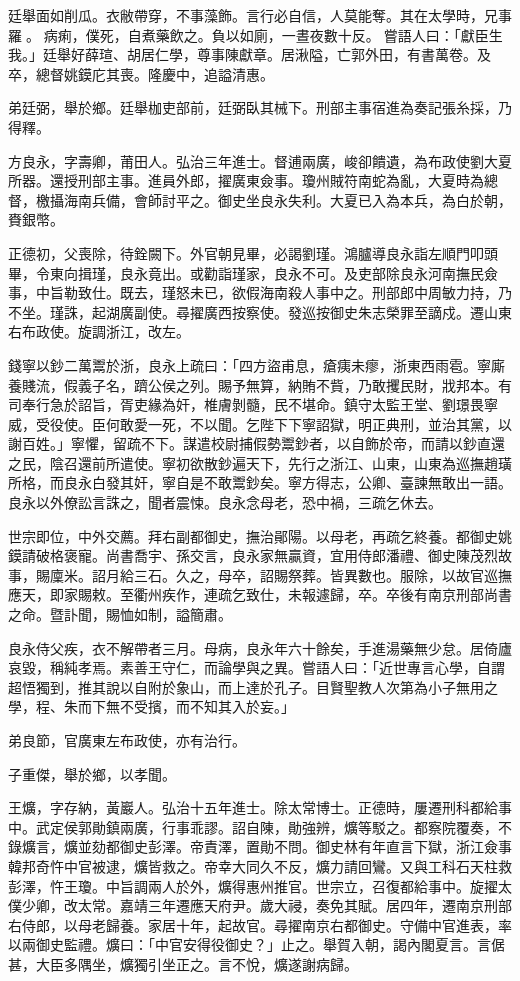 \begin{pinyinscope}
廷舉面如削瓜。衣敝帶穿，不事藻飾。言行必自信，人莫能奪。其在太學時，兄事羅。病痢，僕死，自煮藥飲之。負以如廁，一晝夜數十反。嘗語人曰：「獻臣生我。」廷舉好薛瑄、胡居仁學，尊事陳獻章。居湫隘，亡郭外田，有書萬卷。及卒，總督姚鏌庀其喪。隆慶中，追謚清惠。

弟廷弼，舉於鄉。廷舉枷吏部前，廷弼臥其械下。刑部主事宿進為奏記張糸採，乃得釋。

方良永，字壽卿，莆田人。弘治三年進士。督逋兩廣，峻卻饋遺，為布政使劉大夏所器。還授刑部主事。進員外郎，擢廣東僉事。瓊州賊符南蛇為亂，大夏時為總督，檄攝海南兵備，會師討平之。御史坐良永失利。大夏已入為本兵，為白於朝，賚銀幣。

正德初，父喪除，待銓闕下。外官朝見畢，必謁劉瑾。鴻臚導良永詣左順門叩頭畢，令東向揖瑾，良永竟出。或勸詣瑾家，良永不可。及吏部除良永河南撫民僉事，中旨勒致仕。既去，瑾怒未已，欲假海南殺人事中之。刑部郎中周敏力持，乃不坐。瑾誅，起湖廣副使。尋擢廣西按察使。發巡按御史朱志榮罪至謫戍。遷山東右布政使。旋調浙江，改左。

錢寧以鈔二萬鬻於浙，良永上疏曰：「四方盜甫息，瘡痍未瘳，浙東西雨雹。寧廝養賤流，假義子名，躋公侯之列。賜予無算，納賄不貲，乃敢攫民財，戕邦本。有司奉行急於詔旨，胥吏緣為奸，椎膚剝髓，民不堪命。鎮守太監王堂、劉璟畏寧威，受役使。臣何敢愛一死，不以聞。乞陛下下寧詔獄，明正典刑，並治其黨，以謝百姓。」寧懼，留疏不下。謀遣校尉捕假勢鬻鈔者，以自飾於帝，而請以鈔直還之民，陰召還前所遣使。寧初欲散鈔遍天下，先行之浙江、山東，山東為巡撫趙璜所格，而良永白發其奸，寧自是不敢鬻鈔矣。寧方得志，公卿、臺諫無敢出一語。良永以外僚訟言誅之，聞者震悚。良永念母老，恐中禍，三疏乞休去。

世宗即位，中外交薦。拜右副都御史，撫治鄖陽。以母老，再疏乞終養。都御史姚鏌請破格褒寵。尚書喬宇、孫交言，良永家無贏資，宜用侍郎潘禮、御史陳茂烈故事，賜廩米。詔月給三石。久之，母卒，詔賜祭葬。皆異數也。服除，以故官巡撫應天，即家賜敕。至衢州疾作，連疏乞致仕，未報遽歸，卒。卒後有南京刑部尚書之命。暨訃聞，賜恤如制，謚簡肅。

良永侍父疾，衣不解帶者三月。母病，良永年六十餘矣，手進湯藥無少怠。居倚廬哀毀，稱純孝焉。素善王守仁，而論學與之異。嘗語人曰：「近世專言心學，自謂超悟獨到，推其說以自附於象山，而上達於孔子。目賢聖教人次第為小子無用之學，程、朱而下無不受擯，而不知其入於妄。」

弟良節，官廣東左布政使，亦有治行。

子重傑，舉於鄉，以孝聞。

王爌，字存納，黃巖人。弘治十五年進士。除太常博士。正德時，屢遷刑科都給事中。武定侯郭勛鎮兩廣，行事乖謬。詔自陳，勛強辨，爌等駁之。都察院覆奏，不錄爌言，爌並劾都御史彭澤。帝責澤，置勛不問。御史林有年直言下獄，浙江僉事韓邦奇忤中官被逮，爌皆救之。帝幸大同久不反，爌力請回鸞。又與工科石天柱救彭澤，忤王瓊。中旨調兩人於外，爌得惠州推官。世宗立，召復都給事中。旋擢太僕少卿，改太常。嘉靖三年遷應天府尹。歲大祲，奏免其賦。居四年，遷南京刑部右侍郎，以母老歸養。家居十年，起故官。尋擢南京右都御史。守備中官進表，率以兩御史監禮。爌曰：「中官安得役御史？」止之。舉賀入朝，謁內閣夏言。言倨甚，大臣多隅坐，爌獨引坐正之。言不悅，爌遂謝病歸。


\end{pinyinscope}
